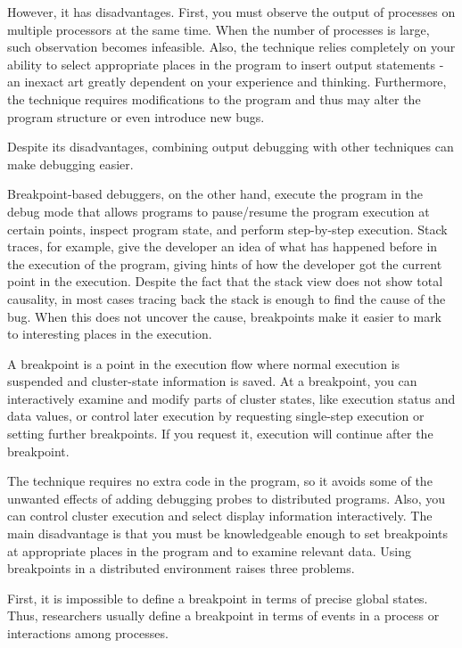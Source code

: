 	However, it has disadvantages. First, you must observe the output of processes on multiple processors at the same time. When the number of processes is large, such observation becomes infeasible. Also, the technique relies completely on your ability to select appropriate places in the program to insert output statements - an inexact art greatly dependent on your experience and thinking. Furthermore, the technique requires modifications to the program and thus may alter the program structure or even introduce new bugs.
	
	Despite its disadvantages, combining output debugging with other techniques can make debugging easier.

	
	Breakpoint-based debuggers, on the other hand, execute the program in the debug mode that allows programs to pause/resume the program execution at certain points, inspect program state, and perform step-by-step execution. Stack traces, for example, give the developer an idea of what has happened before in the execution of the program, giving hints of how the developer got the current point in the execution. Despite the fact that the stack view does not show total causality, in most cases tracing back the stack is enough to find the cause of the bug. When this does not uncover the cause, breakpoints make it easier to mark to interesting places in the execution.
	
	A breakpoint is a point in the execution flow where normal execution is suspended and cluster-state information is saved. At a breakpoint, you can interactively examine and modify parts of cluster states, like execution status and data values, or control later execution by requesting single-step execution or setting further breakpoints. If you request it, execution will continue after the breakpoint.
	
	The technique requires no extra code in the program, so it avoids some of the unwanted effects of adding debugging probes to distributed programs. Also, you can control cluster execution and select display information interactively. The main disadvantage is that you must be knowledgeable enough to set breakpoints at appropriate places in the program and to examine relevant data. Using breakpoints in a distributed environment raises three problems.
	
	First, it is impossible to define a breakpoint in terms of precise global states. Thus, researchers usually define a breakpoint in terms of events in a process or interactions among processes.
	
